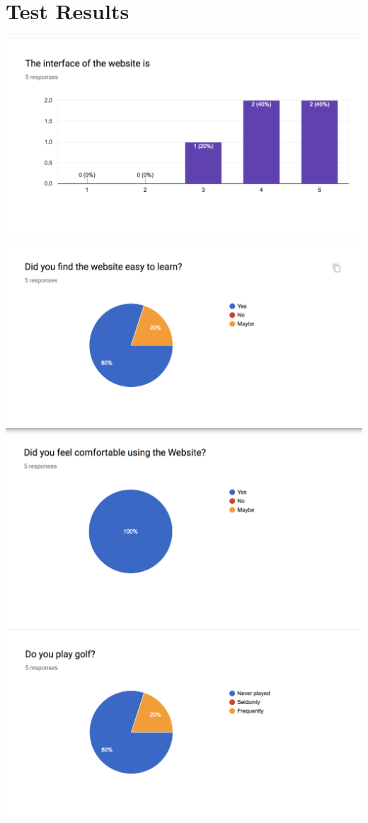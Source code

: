 \documentclass{article}
\begin{document}
	\section{Test Results}
	\includegraphics[scale=0.5]{g1}
	\includegraphics[scale=0.5]{g2}
	\includegraphics[scale=0.5]{g3}
	\includegraphics[scale=0.5]{g4}
\end{document}
